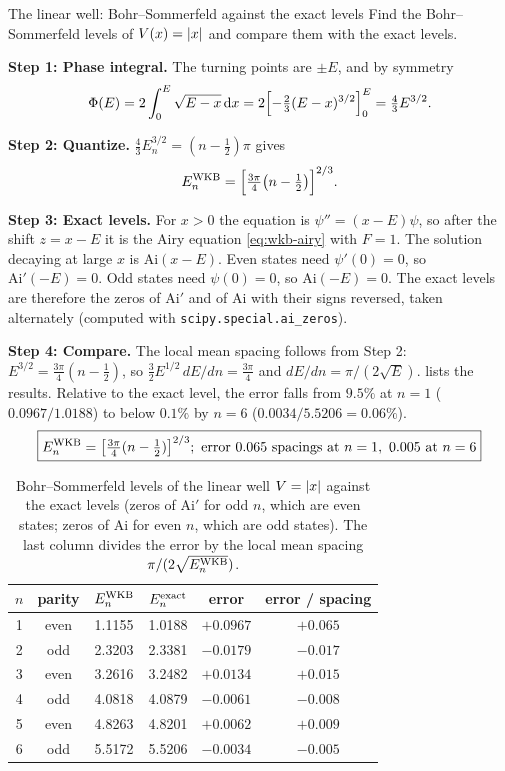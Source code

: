\begin{sample}{The linear well: Bohr--Sommerfeld against the exact levels}
Find the Bohr--Sommerfeld levels of $V(x)=\left\lvert x\right\rvert$ and compare them with the exact levels.

\textbf{Step 1: Phase integral.} The turning points are $\pm E$, and by symmetry
\[
\Phi(E)=2\int_0^E\sqrt{E-x}\,\mathrm{d} x=2\Bigl[-\tfrac23(E-x)^{3/2}\Bigr]_0^E=\tfrac43E^{3/2}.
\]

\textbf{Step 2: Quantize.} $\frac43E_n^{3/2}=(n-\frac12)\pi$ gives
\[
E_n^{\rm WKB}=\Bigl[\tfrac{3\pi}{4}\bigl(n-\tfrac12\bigr)\Bigr]^{2/3}.
\]

\textbf{Step 3: Exact levels.} For $x>0$ the equation is $\psi''=(x-E)\psi$, so after the shift $z=x-E$ it is the Airy equation \cref{eq:wkb-airy} with $F=1$. The solution decaying at large $x$ is $\mathrm{Ai}(x-E)$. Even states need $\psi'(0)=0$, so $\mathrm{Ai}'(-E)=0$. Odd states need $\psi(0)=0$, so $\mathrm{Ai}(-E)=0$. The exact levels are therefore the zeros of $\mathrm{Ai}'$ and of $\mathrm{Ai}$ with their signs reversed, taken alternately (computed with \texttt{scipy.special.ai\_zeros}).

\textbf{Step 4: Compare.} The local mean spacing follows from Step 2: $E^{3/2}=\frac{3\pi}4(n-\frac12)$, so $\frac32E^{1/2}\,dE/dn=\frac{3\pi}{4}$ and $dE/dn=\pi/(2\sqrt E)$.  lists the results. Relative to the exact level, the error falls from $9.5\%$ at $n=1$ ($0.0967/1.0188$) to below $0.1\%$ by $n=6$ ($0.0034/5.5206=0.06\%$).
\[
\boxed{E_n^{\rm WKB}=\bigl[\tfrac{3\pi}{4}(n-\tfrac12)\bigr]^{2/3};\ \text{error }0.065\ \text{spacings at }n=1,\ 0.005\ \text{at }n=6}
\]
\end{sample}

\begin{table}[htbp]\centering
\caption{Bohr--Sommerfeld levels of the linear well $V=\left\lvert x\right\rvert$ against the exact levels (zeros of $\mathrm{Ai}'$ for odd $n$, which are even states; zeros of $\mathrm{Ai}$ for even $n$, which are odd states). The last column divides the error by the local mean spacing $\pi/(2\sqrt{E^{\rm WKB}_n})$.}
\label{tab:wkb-linear}
\begin{tabular}{cccccc}
\toprule
$n$ & parity & $E_n^{\rm WKB}$ & $E_n^{\rm exact}$ & error & error / spacing\\
\midrule
1 & even & 1.1155 & 1.0188 & $+0.0967$ & $+0.065$\\
2 & odd  & 2.3203 & 2.3381 & $-0.0179$ & $-0.017$\\
3 & even & 3.2616 & 3.2482 & $+0.0134$ & $+0.015$\\
4 & odd  & 4.0818 & 4.0879 & $-0.0061$ & $-0.008$\\
5 & even & 4.8263 & 4.8201 & $+0.0062$ & $+0.009$\\
6 & odd  & 5.5172 & 5.5206 & $-0.0034$ & $-0.005$\\
\bottomrule
\end{tabular}
\end{table}

